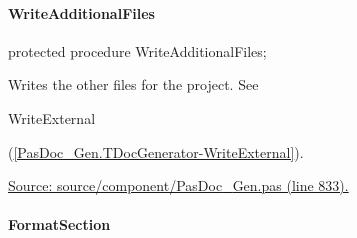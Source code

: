 \documentclass{report}
\newif\ifpdf
\begin{document}
\paragraph*{WriteAdditionalFiles}\hspace*{\fill}

\label{PasDoc_Gen.TDocGenerator-WriteAdditionalFiles}
\begin{list}{}{
\setlength{\itemindent}{0cm}
\setlength{\listparindent}{0cm}
\setlength{\leftmargin}{\evensidemargin}
\addtolength{\leftmargin}{\tmplength}
\settowidth{\labelsep}{X}
\addtolength{\leftmargin}{\labelsep}
\setlength{\labelwidth}{\tmplength}
}
\item[\textbf{Declaration}\hfill]
\ifpdf
\begin{flushleft}
\fi
\begin{ttfamily}
protected procedure WriteAdditionalFiles;\end{ttfamily}

\ifpdf
\end{flushleft}
\fi

\par
\item[\textbf{Description}]
Writes the other files for the project. See \begin{ttfamily}WriteExternal\end{ttfamily}(\ref{PasDoc_Gen.TDocGenerator-WriteExternal}).\par
\href{https://github.com/pasdoc/pasdoc/blob/master/source/component/PasDoc_Gen.pas#L833}{Source: source/component/PasDoc{\_}Gen.pas (line 833).}

\end{list}
\paragraph*{FormatSection}\hspace*{\fill}
\end{document}
